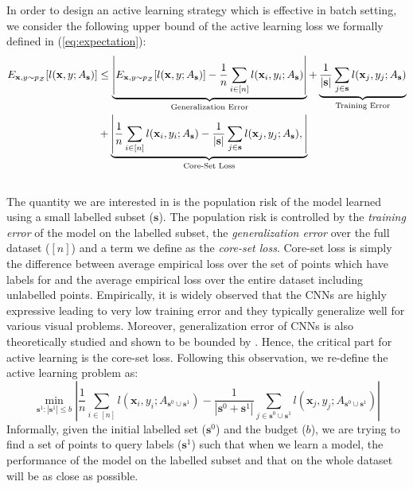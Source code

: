 \documentclass{article} \usepackage{iclr2018_conference,times}
\begin{document}
In order to design an active learning strategy which is effective in batch setting, we consider the following upper
bound of the active learning loss we formally defined in (\ref{eq:expectation}):
{ \small 
\begin{equation} \begin{aligned} 
E_{\mathbf{x},y \sim p_\mathcal{Z}} [l(\mathbf{x},y; A_{\mathbf{s}})]  &\leq \underbrace{\left| E_{\mathbf{x},y \sim p_\mathcal{Z}} [l(\mathbf{x},y; A_{\mathbf{s}})] - \frac{1}{n}\sum_{i \in [n]} l(\mathbf{x}_i,y_i; A_{\mathbf{s}}) \right|}_{\text{Generalization Error}}  + \underbrace{\frac{1}{|\mathbf{s}|}\sum_{j \in \mathbf{s}} l(\mathbf{x}_j,y_j; A_{\mathbf{s}})}_{\text{Training Error}} \\ &+
   \underbrace{\left| \frac{1}{n}\sum_{i \in [n]} l(\mathbf{x}_i,y_i; A_{\mathbf{s}}) - \frac{1}{|\mathbf{s}|}\sum_{j \in \mathbf{s}} l(\mathbf{x}_j,y_j; A_{\mathbf{s}}), \right|}_{\text{Core-Set Loss}} 
   \\ &
\end{aligned} \vspace{-3mm} \end{equation} }
The quantity we are interested in is the population risk of the model learned using a small labelled subset ($\mathbf{s}$).
The population risk is controlled by the \emph{training error} of the model on the labelled subset, the \emph{generalization error} over the
full dataset ($[n]$) and a term we define as the \emph{core-set loss}. Core-set loss is simply the
difference between average empirical loss over the set of points which have labels for and the average empirical loss over the entire
dataset including unlabelled points. Empirically, it is widely observed that the CNNs are highly expressive leading to very low training error and they typically generalize well for various visual problems. Moreover, generalization error of CNNs is also theoretically studied and shown to be bounded by \citet{robust}. Hence, the critical part for active learning is the core-set loss. Following this observation, we re-define the active learning problem as:
\begin{equation} \min_{\mathbf{s}^1 : |\mathbf{s}^1| \leq b} 
\left| \frac{1}{n}\sum_{i \in [n]} l(\mathbf{x}_i,y_i; A_{\mathbf{s}^0 \cup \mathbf{s}^1}) -
    \frac{1}{|\mathbf{s}^0+\mathbf{s}^1|}\sum_{j \in \mathbf{s}^0 \cup \mathbf{s}^1} l(\mathbf{x}_j,y_j;A_{\mathbf{s}^0 \cup \mathbf{s}^1})
    \right|
    \label{eq:new_active_learning}
\end{equation} 
Informally, given the initial labelled set ($\mathbf{s}^0$) and the budget ($b$), we are trying to find a set of points
to query labels ($\mathbf{s}^1$) such that when we learn a model, the performance of the model on the labelled subset
and that on the whole dataset will be as close as possible.
\end{document}
